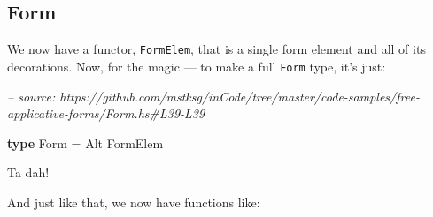 \documentclass[]{article}
\newenvironment{Shaded}{}{}
\newcommand{\CommentTok}[1]{\textcolor[rgb]{0.38,0.63,0.69}{\textit{#1}}}
\newcommand{\DataTypeTok}[1]{\textcolor[rgb]{0.56,0.13,0.00}{#1}}
\newcommand{\FunctionTok}[1]{\textcolor[rgb]{0.02,0.16,0.49}{#1}}
\newcommand{\KeywordTok}[1]{\textcolor[rgb]{0.00,0.44,0.13}{\textbf{#1}}}
\begin{document}
\hypertarget{form}{%
\subsection{Form}\label{form}}

We now have a functor, \texttt{FormElem}, that is a single form element and all
of its decorations. Now, for the magic --- to make a full \texttt{Form} type,
it's just:

\begin{Shaded}
\begin{Highlighting}[]
\CommentTok{-- source: https://github.com/mstksg/inCode/tree/master/code-samples/free-applicative-forms/Form.hs#L39-L39}

\KeywordTok{type} \DataTypeTok{Form} \FunctionTok{=} \DataTypeTok{Alt} \DataTypeTok{FormElem}
\end{Highlighting}
\end{Shaded}

Ta dah!

And just like that, we now have functions like:
\end{document}
